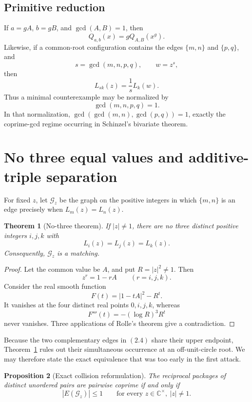 \documentclass[11pt]{article}
\newtheorem{theorem}{Theorem}[section]
\newtheorem{proposition}[theorem]{Proposition}
\theoremstyle{definition}
\newcommand{\C}{\mathbb C}
\begin{document}
\subsection{Primitive reduction}

If \(a=gA\), \(b=gB\), and \(\gcd(A,B)=1\), then
\begin{equation}
 Q_{a,b}(x)=gQ_{A,B}(x^g).
 \tag{2.5}
\end{equation}
Likewise, if a common-root configuration contains the edges \(\{m,n\}\) and
\(\{p,q\}\), and
\[
 s=\gcd(m,n,p,q),\qquad w=z^s,
\]
then
\begin{equation}
 L_{sk}(z)=\frac1sL_k(w).
 \tag{2.6}
\end{equation}
Thus a minimal counterexample may be normalized by
\[
 \gcd(m,n,p,q)=1.
 \tag{2.7}
\]
In that normalization,
\(\gcd(\gcd(m,n),\gcd(p,q))=1\), exactly the coprime-gcd regime occurring in
Schinzel's bivariate theorem.

\section{No three equal values and additive-triple separation}

For fixed \(z\), let \(\mathcal G_z\) be the graph on the positive integers in
which \(\{m,n\}\) is an edge precisely when \(L_m(z)=L_n(z)\).

\begin{theorem}[No-three theorem]\label{thm:nothree}
If \(|z|\neq1\), there are no three distinct positive integers \(i,j,k\) with
\[
 L_i(z)=L_j(z)=L_k(z).
\]
Consequently, \(\mathcal G_z\) is a matching.
\end{theorem}

\begin{proof}
Let the common value be \(A\), and put \(R=|z|^2\neq1\).  Then
\[
 z^r=1-rA\qquad(r=i,j,k).
\]
Consider the real smooth function
\[
 F(t)=|1-tA|^2-R^t.
\]
It vanishes at the four distinct real points \(0,i,j,k\), whereas
\[
 F'''(t)=-(\log R)^3R^t
\]
never vanishes.  Three applications of Rolle's theorem give a contradiction.
\end{proof}

Because the two complementary edges in \((2.4)\) share their upper endpoint,
Theorem~\ref{thm:nothree} rules out their simultaneous occurrence at an
off-unit-circle root.  We may therefore state the exact equivalence that was too early
in the first attack.

\begin{proposition}[Exact collision reformulation]\label{prop:equivalence}
The reciprocal packages of distinct unordered pairs are pairwise coprime if
and only if
\[
 |E(\mathcal G_z)|\leq1
 \qquad\text{for every }z\in\C^\times,\ \lvert z\rvert\neq1.
 \tag{3.1}
\]
\end{proposition}
\end{document}
